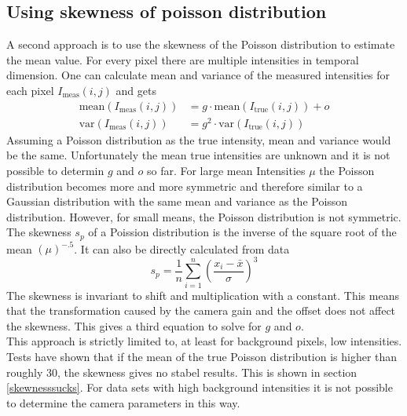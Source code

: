 \subsection{Using skewness of poisson distribution}
A second approach is to use the skewness of the Poisson distribution to estimate the mean value.\newline
For every pixel there are multiple intensities in temporal dimension. One can
calculate mean and variance of the measured intensities for each pixel $I_\text{meas}(i,j)$ and
gets
\begin{align}
	\text{mean}(I_\text{meas}(i,j))& = g\cdot \text{mean}(I_\text{true}(i,j)) + o \label{meanvarPoiss1}\\
	\text{var}(I_\text{meas}(i,j))& = g^2\cdot\text{var}(I_\text{true}(i,j)) \label{meanvarPoiss2}
\end{align}
Assuming a Poisson distribution as the true intensity, mean and variance would
be the same. Unfortunately the mean true intensities are unknown and it is
not possible to determin $g$ and $o$ so far. For large mean Intensities $\mu$
the Poisson distribution becomes more and more symmetric and therefore similar to a Gaussian distribution
with the same mean and variance as the Poisson distribution. However, for small means, the Poisson distribution is not
symmetric. The skewness $s_p$ of a Poission distribution is the inverse of the
square root of the mean $(\mu)^{-.5}$. It can also be directly
calculated from data
\begin{equation}
	s_p = \frac{1}{n}\sum_{i = 1}^n \left(\frac{x_i - \bar x}{\sigma}\right)^3
\end{equation}
The skewness is invariant to shift and multiplication with a constant. This
means that the transformation caused by the camera gain and the offset
does not affect the skewness. This gives a third equation to solve for $g$ and
$o$.\\
This approach is strictly limited to, at least for background pixels, low intensities. Tests have shown that if the mean of the true Poisson distribution is higher than roughly 30, the skewness gives no stabel results. This is shown in section \ref{skewnesssucks}. For data sets with high background intensities it is not possible to determine the camera parameters in this way.

